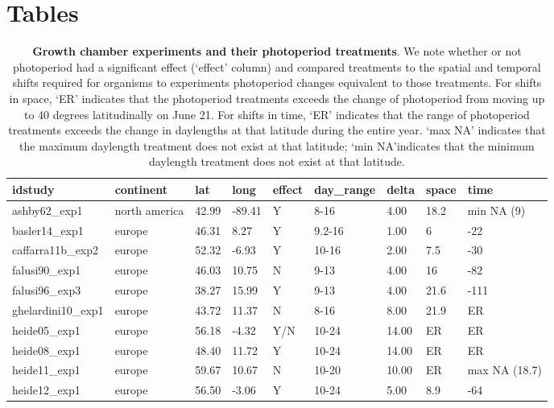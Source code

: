 \documentclass{article}
\begin{document}
\section* {Tables}
\begin{table}[ht]
\centering
\caption{\textbf{Growth chamber experiments and their photoperiod treatments}. We note whether or not photoperiod had a significant effect (`effect' column) and compared treatments to the spatial and temporal shifts required for organisms to experiments photoperiod changes equivalent to those treatments. For shifts in space, `ER' indicates that the photoperiod treatments exceeds the change of photoperiod from moving up to 40 degrees latitudinally on June 21. For shifts in time, `ER' indicates that the range of photoperiod treatments exceeds the change in daylengths at that latitude during the entire year. `max NA' indicates that the maximum daylength treatment does not exist at that latitude; `min NA'indicates that the minimum daylength treatment does not exist at that latitude.} 
\label{table:phototreats}
\begin{tabular}{|p{}|p{}|p{}|p{}|p{}|p{}|p{}|p{}|p{}|}
  \hline
idstudy & continent & lat & long & effect & day\_range & delta & space & time \\ 
  \hline
ashby62\_exp1 & north america & 42.99 & -89.41 & Y & 8-16 & 4.00 & 18.2 & min NA (9) \\ 
  basler14\_exp1 & europe & 46.31 & 8.27 & Y & 9.2-16 & 1.00 & 6 & -22 \\ 
  caffarra11b\_exp2 & europe & 52.32 & -6.93 & Y & 10-16 & 2.00 & 7.5 & -30 \\ 
  falusi90\_exp1 & europe & 46.03 & 10.75 & N & 9-13 & 4.00 & 16 & -82 \\ 
  falusi96\_exp3 & europe & 38.27 & 15.99 & Y & 9-13 & 4.00 & 21.6 & -111 \\ 
  ghelardini10\_exp1 & europe & 43.72 & 11.37 & N & 8-16 & 8.00 & 21.9 & ER \\ 
  heide05\_exp1 & europe & 56.18 & -4.32 & Y/N & 10-24 & 14.00 & ER & ER \\ 
  heide08\_exp1 & europe & 48.40 & 11.72 & Y & 10-24 & 14.00 & ER & ER \\ 
  heide11\_exp1 & europe & 59.67 & 10.67 & N & 10-20 & 10.00 & ER & max NA (18.7) \\ 
  heide12\_exp1 & europe & 56.50 & -3.06 & Y & 10-24 & 5.00 & 8.9 & -64 \\ 

\end{tabular}
\end{table}
\end{document}
